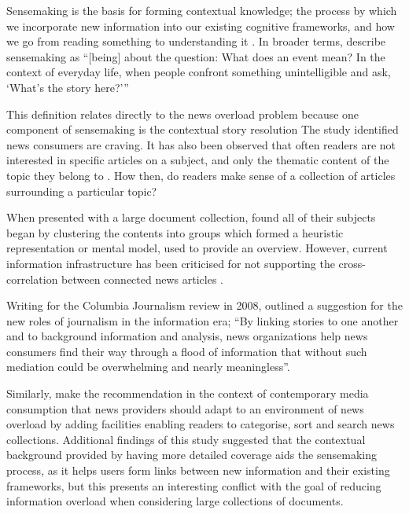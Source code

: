 Sensemaking is the basis for forming contextual knowledge; the process by which we incorporate new information into our existing cognitive frameworks, and how we go from reading something to understanding it \citep{FromInformationToKnowing}. In broader terms, \citeauthor{OrganizingAndTheProcessOfSensemaking} describe sensemaking as ``[being] about the question: What does an event mean? In the context of everyday life, when people confront something unintelligible and ask, `What's the story here?'{}'' \citep[p.85]{OrganizingAndTheProcessOfSensemaking} 

This definition relates directly to the news overload problem because one component of sensemaking is the contextual story resolution The \citet{anewmodelfornews} study identified news consumers are craving. It has also been observed that often readers are not interested in specific articles on a subject, and only the thematic content of the topic they belong to \citep{AnalysingUserAccessToAnOnlineNewspaper}. How then, do readers make sense of a collection of articles surrounding a particular topic?

When presented with a large document collection, \citet{BeingLiteratreWithLargeDocumentCollections} found all of their subjects began by clustering the contents into groups which formed a heuristic representation or mental model, used to provide an overview. However, current information infrastructure has been criticised for not supporting the cross-correlation between connected news articles \citep{GalaxyOfNews}.

Writing for the Columbia Journalism review in 2008, \citeauthor{overloadjournalismsbattle} outlined a suggestion for the new roles of journalism in the information era; ``By linking stories to one another and to background information and analysis, news organizations help news consumers find their way through a flood of information that without such mediation could be overwhelming and nearly meaningless''\citep[p.10]{overloadjournalismsbattle}. 

Similarly, \citet{FromInformationToKnowing} make the recommendation in the context of contemporary media consumption that news providers should adapt to an environment of news overload by adding facilities enabling readers to categorise, sort and search news collections. Additional findings of this study suggested that the contextual background provided by having more detailed coverage aids the sensemaking process, as it helps users form links between new information and their existing frameworks, but this presents an interesting conflict with the goal of reducing information overload when considering large collections of documents.

